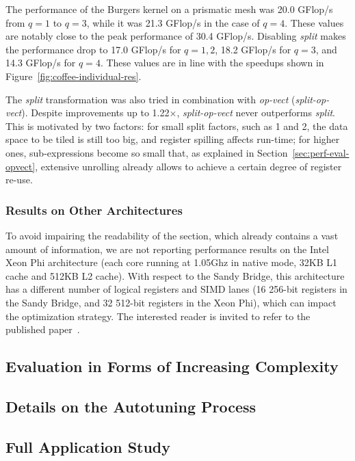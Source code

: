 The performance of the Burgers kernel on a prismatic mesh was 20.0 GFlop/s from $q=1$ to $q=3$, while it was 21.3 GFlop/s in the case of $q=4$. These values are notably close to the peak performance of 30.4 GFlop/s. Disabling \emph{split} makes the performance drop to 17.0 GFlop/s for $q=1, 2$, 18.2 GFlop/s for $q=3$,
and 14.3 GFlop/s for $q=4$. These values are in line with the speedups shown in Figure~\ref{fig:coffee-individual-res}.

The \emph{split} transformation was also tried in combination with \emph{op-vect} (\emph{split-op-vect}). Despite improvements up to 1.22$\times$, \emph{split-op-vect} never outperforms \emph{split}. This is motivated by two factors: for small split factors, such as 1 and 2, the data space to be tiled is still too big, and register spilling affects run-time; for higher ones, sub-expressions become so small that, as explained in Section~\ref{sec:perf-eval-opvect}, extensive unrolling already allows to achieve a certain degree of register re-use.

\subsubsection*{Results on Other Architectures}
To avoid impairing the readability of the section, which already contains a vast amount of information, we are not reporting performance results on the Intel Xeon Phi  architecture (each core running at 1.05Ghz in native mode, 32KB L1 cache and 512KB L2 cache). With respect to the Sandy Bridge, this architecture has a different number of logical registers and SIMD lanes (16 256-bit registers in the Sandy Bridge, and 32 512-bit registers in the Xeon Phi), which can impact the optimization strategy. The interested reader is invited to refer to the published paper~\citep{Luporini-coffee}.

\subsection{Evaluation in Forms of Increasing Complexity}
\label{sec:coffee-perfeval-allforms}

\subsection{Details on the Autotuning Process}
\label{sec:coffee-pereval-autotune}

\subsection{Full Application Study}
\label{sec:coffee-pereval-fullapp}

